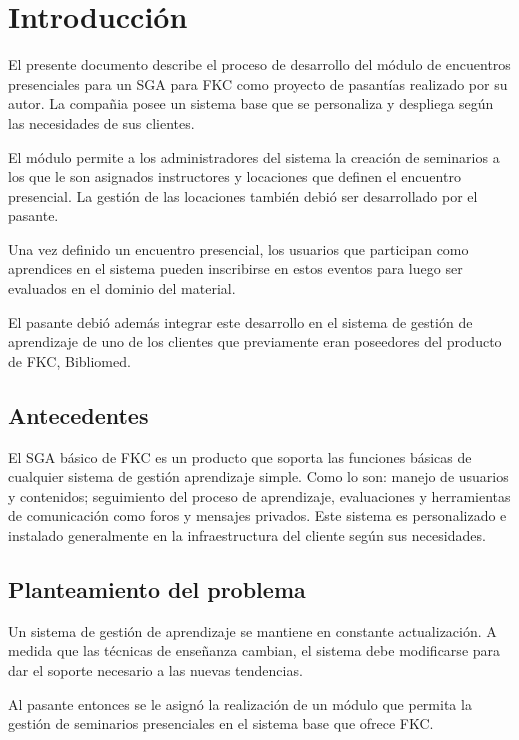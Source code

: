 \chapter*{Introducción}
\thispagestyle{empty} %
 
El presente documento describe el proceso de desarrollo del módulo de encuentros presenciales para un \gls{SGA} para \gls{FKC} como proyecto de pasantías realizado por su autor. La compañia posee un sistema base que se personaliza y despliega según las necesidades de sus clientes.

El módulo permite a los administradores del sistema la creación de seminarios a los que le son asignados instructores y locaciones que definen el encuentro presencial. La gestión de las locaciones también debió ser desarrollado por el pasante.

Una vez definido un encuentro presencial, los usuarios que participan como aprendices en el sistema pueden inscribirse en estos eventos para luego ser evaluados en el dominio del material.

El pasante debió además integrar este desarrollo en el sistema de gestión de aprendizaje de uno de los clientes que previamente eran poseedores del producto de FKC, Bibliomed.

\section*{Antecedentes}
El \gls{SGA} básico de \gls{FKC} es un producto que soporta las funciones básicas de cualquier sistema de gestión aprendizaje simple. Como lo son: manejo de usuarios y contenidos; seguimiento del proceso de aprendizaje, evaluaciones y herramientas de comunicación como foros y mensajes privados. Este sistema es personalizado e instalado generalmente en la infraestructura del cliente según sus necesidades.

\section*{Planteamiento del problema}

Un sistema de gestión de aprendizaje se mantiene en constante actualización. A medida que las técnicas de enseñanza cambian, el sistema debe modificarse para dar el soporte necesario a las nuevas tendencias.

Al pasante entonces se le asignó la realización de un módulo que permita la gestión de seminarios presenciales en el sistema base que ofrece \gls{FKC}.

